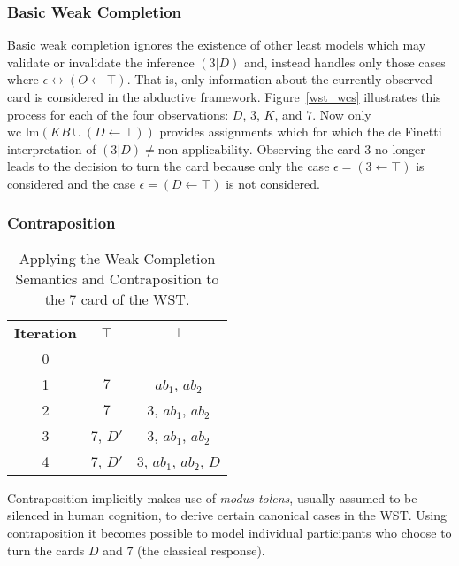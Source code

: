 \subsubsection*{Basic Weak Completion}

Basic weak completion ignores the existence of other least models which may validate or invalidate the inference $(3|D)$ and, instead handles only those cases where $\epsilon \leftrightarrow (O\leftarrow \top)$. That is, only information about the currently observed card is considered in the abductive framework. Figure~\ref{wst_wcs} illustrates this process for each of the four observations: $D$, $3$, $K$, and $7$. Now only $\textrm{wc lm}(KB \cup (D \leftarrow \top))$ provides assignments which for which the de Finetti interpretation of $(3|D)\neq \textrm{non-applicability}$. Observing the card $3$ no longer leads to the decision to turn the card because only the case $\epsilon = (3\leftarrow \top)$ is considered and the case $\epsilon = (D \leftarrow \top)$ is not considered.

\subsubsection*{Contraposition}
\begin{table}
\begin{center}
\begin{tabular}{ c c c }
 \textbf{Iteration} & \textbf{$\top$} & \textbf{$\bot$} \\ 
 0 &  &  \\  
 1 &  $7$ & $ab_1$, $ab_2$  \\  
 2 &  $7$ & $3$, $ab_1$, $ab_2$  \\
 3 &  $7$, $D'$ & $3$, $ab_1$, $ab_2$  \\
 4 &  $7$, $D'$ & $3$, $ab_1$, $ab_2$, $D$  
\end{tabular}
\caption{Applying the Weak Completion Semantics and Contraposition to the $7$ card of the WST.}
\label{tbl:7cont}
\end{center}
\end{table}

Contraposition implicitly makes use of \textit{modus tolens}, usually assumed to be silenced in human cognition, to derive certain canonical cases in the WST. Using contraposition it becomes possible to model individual participants who choose to turn the cards $D$ and $7$ (the classical response).

